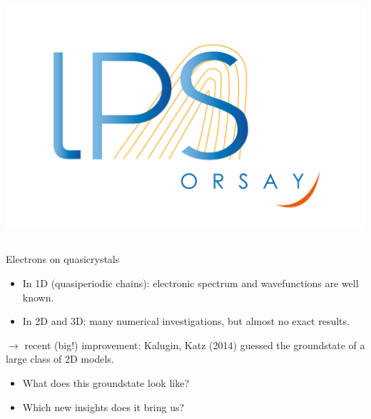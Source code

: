 \documentclass[xcolor=x11names,compress,professionalfonts, aspectratio=169]{beamer}
\renewcommand{\(}{\begin{columns}}
\renewcommand{\)}{\end{columns}}
\newcommand{\<}[1]{\begin{column}{#1}}
\renewcommand{\>}{\end{column}}
\begin{document}
\begin{frame}
\begin{columns}
\begin{column}{2cm}
~\\
~\\
~\\
\raggedleft
\includegraphics[scale=.15]{img/logo-lps.jpg}
\end{column}
\end{columns}
\end{frame}

\begin{frame}{Electrons on quasicrystals}
\begin{itemize}
	\item In 1D (quasiperiodic chains): electronic spectrum and wavefunctions are well known. 
	\item In 2D and 3D: many numerical investigations, but almost no exact results.
\end{itemize}
$\rightarrow$ recent (big!) improvement: Kalugin, Katz (2014) guessed the groundstate of a large class of 2D models.

\begin{itemize}
	\item What does this groundstate look like?
	\item Which new insights does it bring us?
\end{itemize} 
\end{frame}
\end{document}
